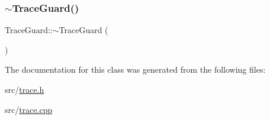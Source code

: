 \subsubsection{\texorpdfstring{$\sim$\+Trace\+Guard()}{~TraceGuard()}}
{\footnotesize\ttfamily Trace\+Guard\+::$\sim$\+Trace\+Guard (\begin{DoxyParamCaption}{ }\end{DoxyParamCaption})}



The documentation for this class was generated from the following files\+:\begin{DoxyCompactItemize}
\item 
src/\hyperlink{trace_8h}{trace.\+h}\item 
src/\hyperlink{trace_8cpp}{trace.\+cpp}\end{DoxyCompactItemize}
